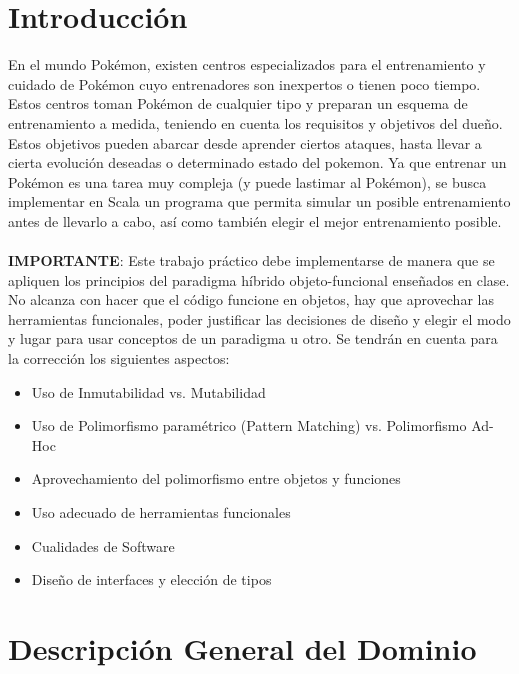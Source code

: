 \documentclass[spanish,a4paper]{article}
\begin{document}
\maketitle


\section{Introducción}

En el mundo Pokémon, existen centros especializados para el entrenamiento y cuidado de Pokémon cuyo entrenadores son inexpertos o tienen poco tiempo. 
Estos centros toman Pokémon de cualquier tipo y preparan un esquema de entrenamiento a medida, teniendo en cuenta los requisitos y objetivos del dueño. 
Estos objetivos pueden abarcar desde aprender ciertos ataques, hasta llevar a cierta evolución deseadas o determinado estado del pokemon.
Ya que entrenar un Pokémon es una tarea muy compleja (y puede lastimar al Pokémon), se busca implementar en Scala un programa que permita simular un posible entrenamiento antes de llevarlo a cabo, así como también elegir el mejor entrenamiento posible.
\\\\
\textbf{IMPORTANTE}: Este trabajo práctico debe implementarse de manera que se apliquen los principios del paradigma híbrido objeto-funcional enseñados en clase. No alcanza con hacer que el código funcione en objetos, hay que aprovechar las herramientas funcionales, poder justificar las decisiones de diseño y elegir el modo y lugar para usar conceptos de un paradigma u otro.
Se tendrán en cuenta para la corrección los siguientes aspectos:

\begin{itemize}
\item Uso de Inmutabilidad vs. Mutabilidad
\item Uso de Polimorfismo paramétrico (Pattern Matching) vs. Polimorfismo Ad-Hoc
\item Aprovechamiento del polimorfismo entre objetos y funciones
\item Uso adecuado de herramientas funcionales
\item Cualidades de Software
\item Diseño de interfaces y elección de tipos
\end{itemize}

\section{Descripción General del Dominio}
\end{document}
